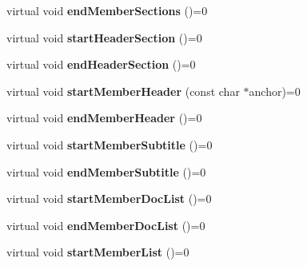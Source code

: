 \begin{DoxyCompactItemize}
\item 
\hypertarget{class_output_generator_a3d64bd937ba680693baa4bb044461943}{virtual void {\bfseries end\-Member\-Sections} ()=0}\label{class_output_generator_a3d64bd937ba680693baa4bb044461943}

\item 
\hypertarget{class_output_generator_aa9d65dc6613e160e36f98f1a55145983}{virtual void {\bfseries start\-Header\-Section} ()=0}\label{class_output_generator_aa9d65dc6613e160e36f98f1a55145983}

\item 
\hypertarget{class_output_generator_ae2e1913df6b1656bc1a27fff130c6dcd}{virtual void {\bfseries end\-Header\-Section} ()=0}\label{class_output_generator_ae2e1913df6b1656bc1a27fff130c6dcd}

\item 
\hypertarget{class_output_generator_aa8016e58e5d5bb9c2724c40fa6fdb79b}{virtual void {\bfseries start\-Member\-Header} (const char $\ast$anchor)=0}\label{class_output_generator_aa8016e58e5d5bb9c2724c40fa6fdb79b}

\item 
\hypertarget{class_output_generator_a0c923fbcf45dfbca8093e104d0bc1507}{virtual void {\bfseries end\-Member\-Header} ()=0}\label{class_output_generator_a0c923fbcf45dfbca8093e104d0bc1507}

\item 
\hypertarget{class_output_generator_a5ab26ee597e0c10bc7be8895bb7a5912}{virtual void {\bfseries start\-Member\-Subtitle} ()=0}\label{class_output_generator_a5ab26ee597e0c10bc7be8895bb7a5912}

\item 
\hypertarget{class_output_generator_ab21258c822bf395b598eb26cdc5c6141}{virtual void {\bfseries end\-Member\-Subtitle} ()=0}\label{class_output_generator_ab21258c822bf395b598eb26cdc5c6141}

\item 
\hypertarget{class_output_generator_ae9666ee46968303181fd14f5083738bb}{virtual void {\bfseries start\-Member\-Doc\-List} ()=0}\label{class_output_generator_ae9666ee46968303181fd14f5083738bb}

\item 
\hypertarget{class_output_generator_a15c515639f8fec2f51e7d2e3bb2f1218}{virtual void {\bfseries end\-Member\-Doc\-List} ()=0}\label{class_output_generator_a15c515639f8fec2f51e7d2e3bb2f1218}

\item 
\hypertarget{class_output_generator_adc4165b6e7d27eb5abc28ff78465fd16}{virtual void {\bfseries start\-Member\-List} ()=0}\label{class_output_generator_adc4165b6e7d27eb5abc28ff78465fd16}


\end{DoxyCompactItemize}
